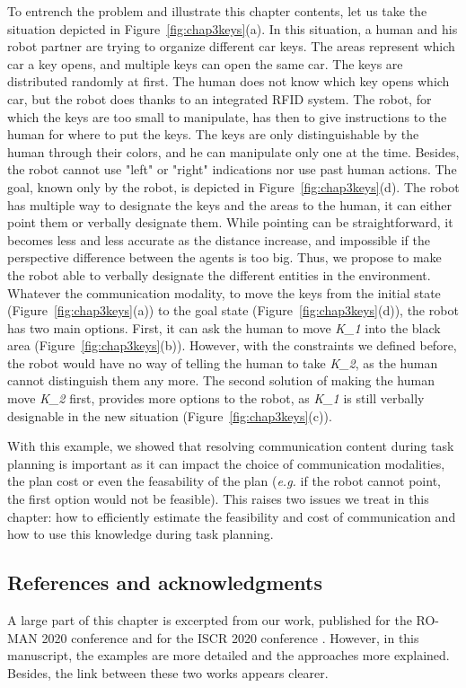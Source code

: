 \documentclass[a4paper,11pt,twoside]{StyleThese}
\begin{document}
To entrench the problem and illustrate this chapter contents, let us take the situation depicted in Figure~\ref{fig:chap3keys}(a). In this situation, a human and his robot partner are trying to organize different car keys. The areas represent which car a key opens, and multiple keys can open the same car. The keys are distributed randomly at first. The human does not know which key opens which car, but the robot does thanks to an integrated RFID system. The robot, for which the keys are too small to manipulate, has then to give instructions to the human for where to put the keys. The keys are only distinguishable by the human through their colors, and he can manipulate only one at the time. Besides, the robot cannot use "left" or "right" indications nor use past human actions.
The goal, known only by the robot, is depicted in Figure~\ref{fig:chap3keys}(d). The robot has multiple way to designate the keys and the areas to the human, it can either point them or verbally designate them. While pointing can be straightforward, it becomes less and less accurate as the distance increase, and impossible if the perspective difference between the agents is too big. Thus, we propose to make the robot able to verbally designate the different entities in the environment.
Whatever the communication modality, to move the keys from the initial state (Figure~\ref{fig:chap3keys}(a)) to the goal state (Figure~\ref{fig:chap3keys}(d)), the robot has two main options. First, it can ask the human to move \textit{K\_1} into the black area (Figure~\ref{fig:chap3keys}(b)). However, with the constraints we defined before, the robot would have no way of telling the human to take \textit{K\_2}, as the human cannot distinguish them any more. The second solution of making the human move \textit{K\_2} first, provides more options to the robot, as \textit{K\_1} is still verbally designable in the new situation (Figure~\ref{fig:chap3keys}(c)).

With this example, we showed that resolving communication content during task planning is important as it can impact the choice of communication modalities, the plan cost or even the feasability of the plan (\textit{e.g.} if the robot cannot point, the first option would not be feasible). This raises two issues we treat in this chapter: how to efficiently estimate the feasibility and cost of communication and how to use this knowledge during task planning.

\subsection{References and acknowledgments}
A large part of this chapter is excerpted from our work, published for the RO-MAN 2020 conference \cite{buisan2020efficient} and for the ISCR 2020 conference \cite{buisan2020human}. However, in this manuscript, the examples are more detailed and the approaches more explained. Besides, the link between these two works appears clearer.
\end{document}
